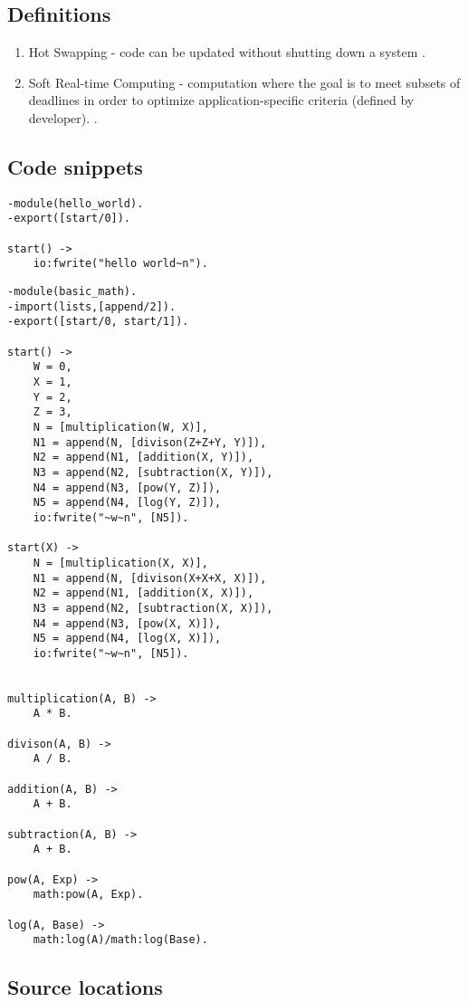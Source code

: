 \documentclass[11 pt]{IEEEtran}
\begin{document}
\subsection{Definitions}
\begin{enumerate}
\item  Hot Swapping - code can be updated without shutting down a system \cite{wiki}.
\item Soft Real-time Computing - computation where the goal is to meet subsets of deadlines in order to optimize application-specific criteria (defined by developer). \cite{soft-rt}.
\end{enumerate}
 
\subsection{Code snippets}

\begin{lstlisting}
-module(hello_world).
-export([start/0]).

start() ->
    io:fwrite("hello world~n").
\end{lstlisting}

\begin{lstlisting}
-module(basic_math).
-import(lists,[append/2]). 
-export([start/0, start/1]).

start() ->
    W = 0,
    X = 1,
    Y = 2,
    Z = 3,
    N = [multiplication(W, X)],
    N1 = append(N, [divison(Z+Z+Y, Y)]),
    N2 = append(N1, [addition(X, Y)]),
    N3 = append(N2, [subtraction(X, Y)]),
    N4 = append(N3, [pow(Y, Z)]),
    N5 = append(N4, [log(Y, Z)]),
    io:fwrite("~w~n", [N5]).

start(X) ->
    N = [multiplication(X, X)],
    N1 = append(N, [divison(X+X+X, X)]),
    N2 = append(N1, [addition(X, X)]),
    N3 = append(N2, [subtraction(X, X)]),
    N4 = append(N3, [pow(X, X)]),
    N5 = append(N4, [log(X, X)]),
    io:fwrite("~w~n", [N5]).


multiplication(A, B) -> 
    A * B.

divison(A, B) -> 
    A / B.

addition(A, B) -> 
    A + B.

subtraction(A, B) -> 
    A + B.

pow(A, Exp) ->
    math:pow(A, Exp).

log(A, Base) ->
    math:log(A)/math:log(Base).
\end{lstlisting}

 \subsection{Source locations}
\end{document}
